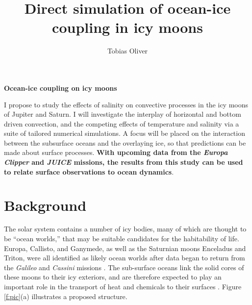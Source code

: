 \documentclass[12pt]{article}
\title{Direct simulation of ocean-ice coupling in icy moons}
\author{Tobias Oliver}
\date{}
\begin{document}
\pagestyle{fancy}
\thispagestyle{fancy}
\fancyhf{} %
\fancyhead[L]{\textcolor{red}{Tobias Oliver\\
Research Proposal}}
\fancyfoot[R]{\thepage}
\newcommand{\citep}[1]{\cite{#1}}
\begin{center}
\large{\textbf{Ocean-ice coupling on icy moons}}
\end{center}

I propose to study the effects of salinity on convective processes in the icy moons of Jupiter and Saturn. 
I will investigate the interplay of horizontal and bottom driven convection, and the competing effects of temperature and salinity via a suite of tailored numerical simulations. 
A focus will be placed on the interaction between the subsurface oceans and the overlaying ice, so that predictions can be made about surface processes. 
\textbf{With upcoming data from the \textit{Europa Clipper} and \textit{JUICE} missions, the results from this study can be used to relate surface observations to ocean dynamics}.

\section{Background}
The solar system contains a number of icy bodies, many of which are thought to be ``ocean worlds,'' that may be suitable candidates for the habitability of life.
Europa, Callisto, and Ganymede, as well as the Saturnian moons Enceladus and Triton, were all identified as likely ocean worlds after data began to return from the \textit{Galileo} and \textit{Cassini} missions \citep{fN16}.
The sub-surface oceans link the solid cores of these moons to their icy exteriors, and are therefore expected to play an important role in the transport of heat and chemicals to their surfaces \citep{kS20}. 
Figure \ref{f:pic}(a) illustrates a proposed structure.
\end{document}
